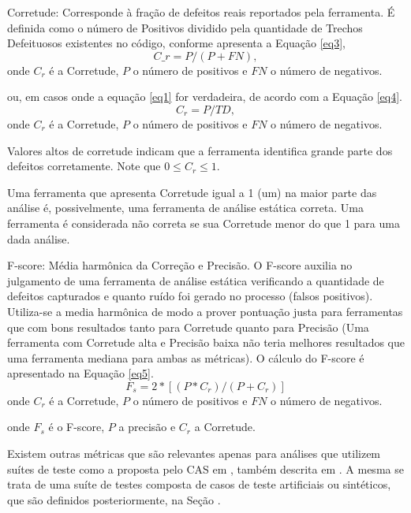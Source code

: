   Corretude: Corresponde à fração de defeitos reais reportados pela ferramenta. É definida como o número de Positivos dividido pela quantidade de Trechos Defeituosos existentes no código, conforme apresenta a Equação \eqref{eq3},
\begin{equation}\label{eq3}
  C\_r = P/(P + FN),
\end{equation}
  onde $C_r$ é a Corretude, $P$ o número de positivos e $FN$ o número de negativos.

  ou, em casos onde a equação \eqref{eq1} for verdadeira, de acordo com a Equação \eqref{eq4}.
\begin{equation}\label{eq4}
C_r = P / TD,
\end{equation}
  onde $C_r$ é a Corretude, $P$ o número de positivos e $FN$ o número de negativos.

  Valores altos de corretude indicam que a ferramenta identifica grande parte dos defeitos corretamente. Note que $0 \leq C_r \leq 1$.

  Uma ferramenta que apresenta Corretude igual a 1 (um) na maior parte das análise é, possivelmente, uma ferramenta de análise estática correta. Uma ferramenta é considerada não correta se sua Corretude  menor do que 1 para uma dada análise.

  F-score: Média harmônica da Correção e Precisão. O F-score auxilia no julgamento de uma ferramenta de análise estática verificando a quantidade de defeitos capturados e quanto ruído foi gerado no processo (falsos positivos). Utiliza-se a media harmônica de modo a prover pontuação justa para ferramentas que com bons resultados tanto para Corretude quanto para Precisão (Uma ferramenta com Corretude alta e Precisão baixa não teria melhores resultados que uma ferramenta mediana para ambas as métricas). O cálculo do F-score é apresentado na Equação \eqref{eq5}.
\begin{equation}\label{eq5}
F_s = 2*[(P * C_r) / (P + C_r)]
\end{equation}
  onde $C_r$ é a Corretude, $P$ o número de positivos e $FN$ o número de negativos.

  onde $F_s$ é o F-score, $P$ a precisão e $C_r$ a Corretude.

  Existem outras métricas que são relevantes apenas para análises que utilizem suítes de teste como a proposta pelo CAS em \cite{nsa}, também descrita em \cite{juliet}. A mesma se trata de uma suíte de testes composta de casos de teste artificiais ou sintéticos, que são definidos posteriormente, na Seção .

